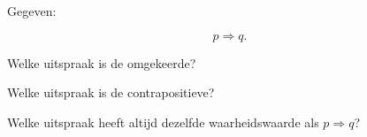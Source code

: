 \documentclass{ximera}
\begin{document}

\begin{oefening}{\oefB\ESS}

Gegeven:

\[
p\Rightarrow q.
\]

\begin{question}

Welke uitspraak is de omgekeerde?

\begin{multipleChoice}





\end{multipleChoice}

\end{question}


\begin{question}

Welke uitspraak is de contrapositieve?

\begin{multipleChoice}





\end{multipleChoice}

\end{question}


\begin{question}

Welke uitspraak heeft altijd dezelfde waarheidswaarde als
$p\Rightarrow q$?

\begin{multipleChoice}




\end{multipleChoice}

\end{question}

\end{oefening}
\end{document}
